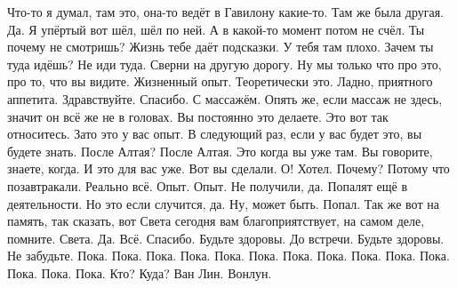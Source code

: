 Что-то я думал, там это, она-то ведёт в Гавилону какие-то.
Там же была другая.
Да.
Я упёртый вот шёл, шёл по ней.
А в какой-то момент потом не счёл.
Ты почему не смотришь?
Жизнь тебе даёт подсказки.
У тебя там плохо.
Зачем ты туда идёшь?
Не иди туда.
Сверни на другую дорогу.
Ну мы только что про это, про то, что вы видите.
Жизненный опыт.
Теоретически это.
Ладно, приятного аппетита.
Здравствуйте.
Спасибо.
С массажём.
Опять же, если массаж не здесь, значит он всё же не в головах.
Вы постоянно это делаете.
Это вот так относитесь.
Зато это у вас опыт.
В следующий раз, если у вас будет это, вы будете знать.
После Алтая?
После Алтая.
Это когда вы уже там.
Вы говорите, знаете, когда.
И это для вас уже.
Вот вы сделали.
О!
Хотел.
Почему?
Потому что позавтракали.
Реально всё.
Опыт.
Опыт.
Не получили, да.
Попалят ещё в деятельности.
Но это если случится, да.
Ну, может быть.
Попал.
Так же вот на память, так сказать, вот Света сегодня
вам благоприятствует, на самом деле, помните.
Света.
Да.
Всё.
Спасибо.
\bye
Будьте здоровы.
До встречи.
Будьте здоровы.
Не забудьте.
Пока.
Пока.
Пока.
Пока.
Пока.
Пока.
Пока.
Пока.
Пока.
Пока.
Пока.
Пока.
Пока.
Пока.
Кто?
Куда?
Ван Лин.
Вонлун.
